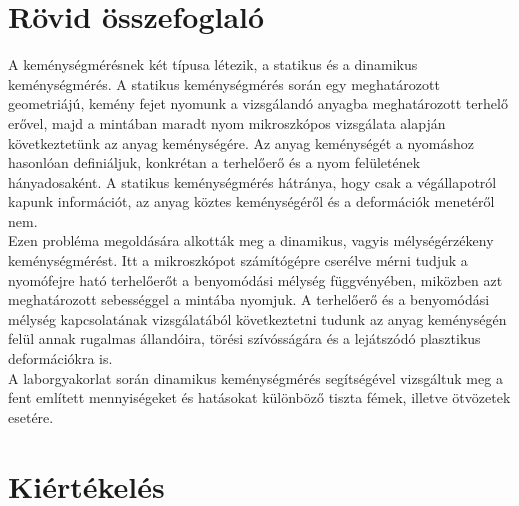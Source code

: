 \documentclass[12pt,a4paper]{article}
\begin{document}
\section{Rövid összefoglaló}
\hspace*{10pt} A keménységmérésnek két típusa létezik, a statikus és a dinamikus keménységmérés. A statikus keménységmérés során egy meghatározott geometriájú, kemény fejet nyomunk a vizsgálandó anyagba meghatározott terhelő erővel, majd a mintában maradt nyom mikroszkópos vizsgálata alapján következtetünk az anyag  keménységére. Az anyag keménységét a nyomáshoz hasonlóan definiáljuk, konkrétan a terhelőerő és a nyom felületének hányadosaként. A statikus keménységmérés hátránya, hogy csak a végállapotról kapunk információt, az anyag köztes keménységéről és a deformációk menetéről nem.\\
\hspace*{10pt} Ezen probléma megoldására alkották meg a dinamikus, vagyis mélységérzékeny keménységmérést. Itt a mikroszkópot számítógépre cserélve mérni tudjuk a nyomófejre ható terhelőerőt a benyomódási mélység függvényében, miközben azt meghatározott sebességgel a mintába nyomjuk. A terhelőerő és a benyomódási mélység kapcsolatának vizsgálatából következtetni tudunk az anyag keménységén felül annak rugalmas állandóira, törési szívósságára és a lejátszódó plasztikus deformációkra is.\\
\hspace*{10pt} A laborgyakorlat során dinamikus keménységmérés segítségével vizsgáltuk meg a fent említett mennyiségeket és hatásokat különböző tiszta fémek, illetve ötvözetek esetére.

\section{Kiértékelés}
\end{document}
